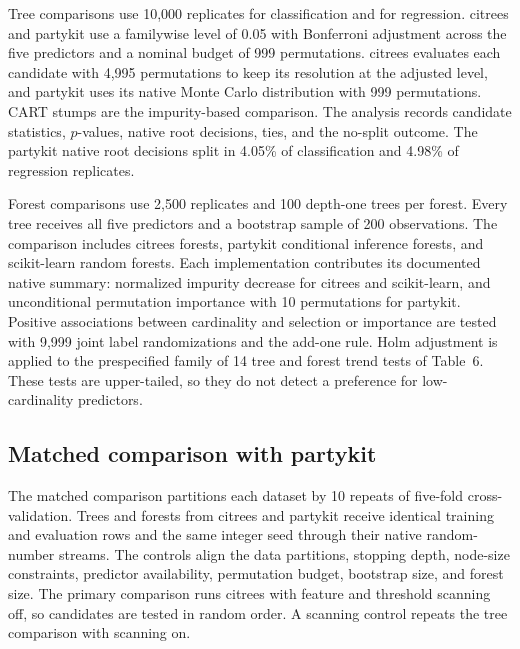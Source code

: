 \documentclass[11pt]{article}
\newcommand{\pkg}[1]{{\normalfont\fontseries{b}\selectfont #1}}
\newcommand{\citrees}{\pkg{citrees}\xspace}
\newcommand{\sklearn}{\pkg{scikit-learn}\xspace}
\begin{document}
Tree comparisons use 10,000 replicates for classification and for
regression. \citrees and \pkg{partykit} use a familywise level of 0.05 with
Bonferroni adjustment across the five predictors and a nominal budget of 999
permutations. \citrees evaluates each candidate with 4,995 permutations to
keep its resolution at the adjusted level, and \pkg{partykit} uses its native
Monte Carlo distribution with 999 permutations. CART stumps are the
impurity-based comparison. The analysis records candidate statistics,
$p$-values, native root decisions, ties, and the no-split outcome. The
\pkg{partykit} native root decisions split in 4.05\% of classification and
4.98\% of regression replicates.

Forest comparisons use 2,500 replicates and 100 depth-one trees per forest.
Every tree receives all five predictors and a bootstrap sample of 200
observations. The comparison includes \citrees forests, \pkg{partykit}
conditional inference forests, and \sklearn random forests. Each
implementation contributes its documented native summary: normalized impurity
decrease for \citrees and \sklearn, and unconditional permutation importance
with 10 permutations for \pkg{partykit}. Positive associations between
cardinality and selection or importance are tested with 9,999 joint label
randomizations and the add-one rule. Holm adjustment is applied to the
prespecified family of 14 tree and forest trend tests of Table~6. These tests
are upper-tailed, so they do not detect a preference for low-cardinality
predictors.

\subsection{Matched comparison with partykit}

The matched comparison partitions each dataset by 10 repeats of five-fold
cross-validation. Trees and forests from \citrees and \pkg{partykit} receive
identical training and evaluation rows and the same integer seed through
their native random-number streams. The controls align the data partitions,
stopping depth, node-size constraints, predictor availability, permutation
budget, bootstrap size, and forest size. The primary comparison runs \citrees
with feature and threshold scanning off, so candidates are tested in random
order. A scanning control repeats the tree comparison with scanning on.
\end{document}
